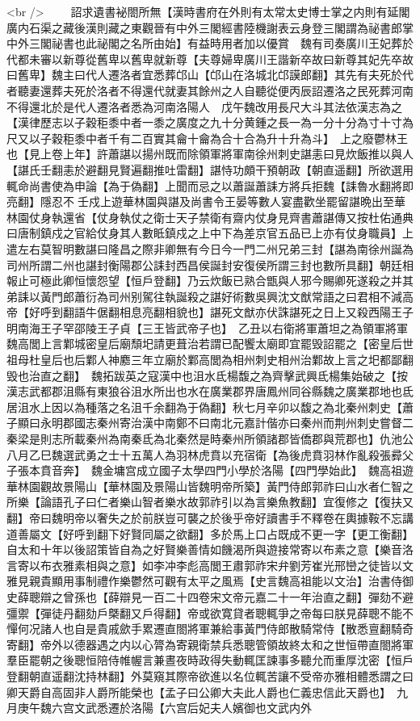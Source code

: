 <br />
　　詔求遺書袐閤所無【漢時書府在外則有太常太史博士掌之内則有延閣廣内石渠之藏後漢則藏之東觀晉有中外三閣經書陸機謝表云身登三閣謂為祕書郎掌中外三閣祕書也此祕閣之名所由始】有益時用者加以優賞　魏有司奏廣川王妃葬於代都未審以新尊從舊卑以舊卑就新尊【夫尊婦卑廣川王諧新卒故曰新尊其妃先卒故曰舊卑】魏主曰代人遷洛者宜悉葬邙山【邙山在洛城北邙謨郎翻】其先有夫死於代者聽妻還葬夫死於洛者不得還代就妻其餘州之人自聽從便丙辰詔遷洛之民死葬河南不得還北於是代人遷洛者悉為河南洛陽人　戊午魏改用長尺大斗其法依漢志為之【漢律歷志以子穀秬黍中者一黍之廣度之九十分黄鍾之長一為一分十分為寸十寸為尺又以子穀秬黍中者千有二百實其龠十龠為合十合為升十升為斗】　上之廢鬱林王也【見上卷上年】許蕭諶以揚州既而除領軍將軍南徐州刺史諶恚曰見炊飯推以與人【諶氏壬翻恚於避翻見賢遍翻推吐雷翻】諶恃功頗干預朝政【朝直遥翻】所欲選用輒命尚書使為申論【為于偽翻】上聞而忌之以蕭誕蕭誄方將兵拒魏【誄魯水翻將即亮翻】隱忍不壬戍上遊華林園與諶及尚書令王晏等數人宴盡歡坐罷留諶晩出至華林園仗身執還省【仗身執仗之衛士天子禁衛有齋内仗身見齊書蕭諶傳又按杜佑通典曰唐制鎮戍之官給仗身其人數眡鎮戍之上中下為差京官五品已上亦有仗身職員】上遣左右莫智明數諶曰隆昌之際非卿無有今日今一門二州兄弟三封【諶為南徐州誕為司州所謂二州也諶封衡陽郡公誄封西昌侯誕封安復侯所謂三封也數所具翻】朝廷相報止可極此卿恒懷怨望【恒戶登翻】乃云炊飯已熟合甑與人邪今賜卿死遂殺之并其弟誄以黃門郎蕭衍為司州别駕往執誕殺之諶好術數吳興沈文猷常語之曰君相不減高帝【好呼到翻語牛倨翻相息亮翻相貌也】諶死文猷亦伏誅諶死之日上又殺西陽王子明南海王子罕邵陵王子貞【三王皆武帝子也】　乙丑以右衛將軍蕭坦之為領軍將軍　魏高閭上言鄴城密皇后廟頹圯請更葺治若謂已配饗太廟即宜罷毁詔罷之【密皇后世祖母杜皇后也后鄴人神䴥三年立廟於鄴高閭為相州刺史相州治鄴故上言之圯都鄙翻毁也治直之翻】　魏拓跋英之寇漢中也沮水氐楊馥之為齊擊武興氐楊集始破之【按漢志武都郡沮縣有東狼谷沮水所出也水在廣業郡界唐鳳州同谷縣魏之廣業郡地也氐居沮水上因以為種落之名沮千余翻為于偽翻】秋七月辛卯以馥之為北秦州刺史【蕭子顯曰永明郡國志秦州寄治漢中南鄭不曰南北元嘉計偕亦曰秦州而荆州刺史嘗督二秦梁是則志所載秦州為南秦氐為北秦然是時秦州所領諸郡皆僑郡與荒郡也】仇池公　八月乙巳魏選武勇之士十五萬人為羽林虎賁以充宿衛【為後虎賁羽林作亂殺張彛父子張本賁音奔】　魏金墉宫成立國子太學四門小學於洛陽【四門學始此】　魏高祖遊華林園觀故景陽山【華林園及景陽山皆魏明帝所築】黃門侍郎郭祚曰山水者仁智之所樂【論語孔子曰仁者樂山智者樂水故郭祚引以為言樂魚教翻】宜復修之【復扶又翻】帝曰魏明帝以奢失之於前朕豈可襲之於後乎帝好讀書手不釋卷在輿據鞍不忘講道善屬文【好呼到翻下好賢同屬之欲翻】多於馬上口占既成不更一字【更工衡翻】自太和十年以後詔策皆自為之好賢樂善情如饑渴所與遊接常寄以布素之意【樂音洛言寄以布衣雅素相與之意】如李冲李彪高閭王肅郭祚宋弁劉芳崔光邢巒之徒皆以文雅見親貴顯用事制禮作樂鬱然可觀有太平之風焉【史言魏高祖能以文治】治書侍御史薛聰辯之曾孫也【薛辯見一百二十四卷宋文帝元嘉二十一年治直之翻】彈劾不避彊禦【彈徒丹翻劾戶槩翻又戶得翻】帝或欲寛貸者聰輒爭之帝每曰朕見薛聰不能不憚何况諸人也自是貴戚歛手累遷直閤將軍兼給事黃門侍郎散騎常侍【散悉亶翻騎奇寄翻】帝外以德器遇之内以心膂為寄親衛禁兵悉聰管領故終太和之世恒帶直閤將軍羣臣罷朝之後聰恒陪侍帷幄言兼晝夜時政得失動輒匡諫事多聽允而重厚沈密【恒戶登翻朝直遥翻沈持林翻】外莫窺其際帝欲進以名位輒苦讓不受帝亦雅相體悉謂之曰卿天爵自高固非人爵所能榮也【孟子曰公卿大夫此人爵也仁義忠信此天爵也】　九月庚午魏六宫文武悉遷於洛陽【六宫后妃夫人嬪御也文武内外